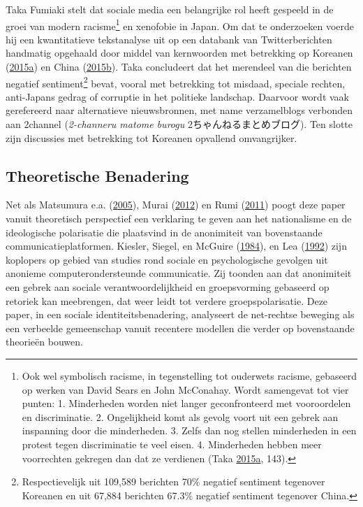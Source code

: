 \documentclass[10.5pt,dutch,]{article}
\begin{document}
Taka Fumiaki stelt dat sociale media een belangrijke rol heeft gespeeld
in de groei van modern racisme\footnote{Ook wel symbolisch racisme, in
  tegenstelling tot ouderwets racisme, gebaseerd op werken van David
  Sears en John McConahay. Wordt samengevat tot vier punten: 1.
  Minderheden worden niet langer geconfronteerd met vooroordelen en
  discriminatie. 2. Ongelijkheid komt als gevolg voort uit een gebrek
  aan inspanning door die minderheden. 3. Zelfs dan nog stellen
  minderheden in een protest tegen discriminatie te veel eisen. 4.
  Minderheden hebben meer voorrechten gekregen dan dat ze verdienen
  (Taka
  \protect\hyperlink{ref-takaux5ftwitterux5f2015-1}{2015}\protect\hyperlink{ref-takaux5ftwitterux5f2015-1}{a},
  143).} en xenofobie in Japan. Om dat te onderzoeken voerde hij een
kwantitatieve tekstanalyse uit op een databank van Twitterberichten
handmatig opgehaald door middel van kernwoorden met betrekking op
Koreanen
(\protect\hyperlink{ref-takaux5ftwitterux5f2015-1}{2015}\protect\hyperlink{ref-takaux5ftwitterux5f2015-1}{a})
en China
(\protect\hyperlink{ref-takaux5ftwitterux5f2015}{2015}\protect\hyperlink{ref-takaux5ftwitterux5f2015}{b}).
Taka concludeert dat het merendeel van die berichten negatief
sentiment\footnote{Respectievelijk uit 109,589 berichten 70\% negatief
  sentiment tegenover Koreanen en uit 67,884 berichten 67.3\% negatief
  sentiment tegenover China.} bevat, vooral met betrekking tot misdaad,
speciale rechten, anti-Japans gedrag of corruptie in het politieke
landschap. Daarvoor wordt vaak gerefereerd naar alternatieve
nieuwsbronnen, met name verzamelblogs verbonden aan 2channel
(\emph{2-channeru matome burogu} 2ちゃんねるまとめブログ). Ten slotte
zijn discussies met betrekking tot Koreanen opvallend omvangrijker.

\subsection{Theoretische Benadering}\label{theoretische-benadering}

Net als Matsumura e.a.
(\protect\hyperlink{ref-matsumuraux5fdynamismux5f2005}{2005}), Murai
(\protect\hyperlink{ref-muraiux5fnetux5f2012}{2012}) en Rumi
(\protect\hyperlink{ref-rumiux5fkoreansux5f2011}{2011}) poogt deze paper
vanuit theoretisch perspectief een verklaring te geven aan het
nationalisme en de ideologische polarisatie die plaatsvind in de
anonimiteit van bovenstaande communicatieplatformen. Kiesler, Siegel, en
McGuire (\protect\hyperlink{ref-kieslerux5fsocialux5f1984}{1984}), en
Lea (\protect\hyperlink{ref-leaux5fsocialux5f1992}{1992}) zijn koplopers
op gebied van studies rond sociale en psychologische gevolgen uit
anonieme computerondersteunde communicatie. Zij toonden aan dat
anonimiteit een gebrek aan sociale verantwoordelijkheid en groepsvorming
gebaseerd op retoriek kan meebrengen, dat weer leidt tot verdere
groepspolarisatie. Deze paper, in een sociale identiteitsbenadering,
analyseert de net-rechtse beweging als een verbeelde gemeenschap vanuit
recentere modellen die verder op bovenstaande theorieën bouwen.
\end{document}
